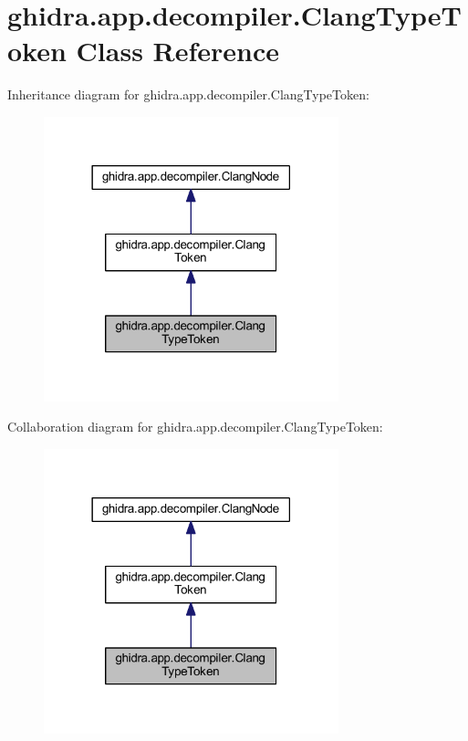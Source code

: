 \hypertarget{classghidra_1_1app_1_1decompiler_1_1_clang_type_token}{}\section{ghidra.\+app.\+decompiler.\+Clang\+Type\+Token Class Reference}
\label{classghidra_1_1app_1_1decompiler_1_1_clang_type_token}


Inheritance diagram for ghidra.\+app.\+decompiler.\+Clang\+Type\+Token\+:
\nopagebreak
\begin{figure}[H]
\begin{center}
\leavevmode
\includegraphics[width=242pt]{classghidra_1_1app_1_1decompiler_1_1_clang_type_token__inherit__graph}
\end{center}
\end{figure}


Collaboration diagram for ghidra.\+app.\+decompiler.\+Clang\+Type\+Token\+:
\nopagebreak
\begin{figure}[H]
\begin{center}
\leavevmode
\includegraphics[width=242pt]{classghidra_1_1app_1_1decompiler_1_1_clang_type_token__coll__graph}
\end{center}
\end{figure}
